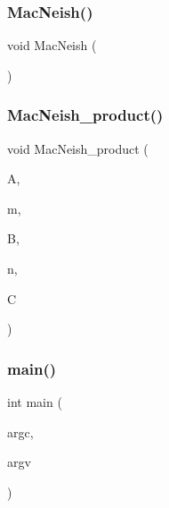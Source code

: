 \mbox{\label{test_8_c_aa6a4aba2ea40865428ca95da4a7f94fc}} 
\subsubsection{\texorpdfstring{Mac\+Neish()}{MacNeish()}}
{\footnotesize\ttfamily void Mac\+Neish (\begin{DoxyParamCaption}{ }\end{DoxyParamCaption})}

\mbox{\label{test_8_c_ae897b5b7c4cdc3f71d634b18fd1ccc96}} 
\subsubsection{\texorpdfstring{Mac\+Neish\+\_\+product()}{MacNeish\_product()}}
{\footnotesize\ttfamily void Mac\+Neish\+\_\+product (\begin{DoxyParamCaption}\item[{\mbox{\hyperlink{galois_8h_a09fddde158a3a20bd2dcadb609de11dc}{I\+NT}} $\ast$}]{A,  }\item[{\mbox{\hyperlink{galois_8h_a09fddde158a3a20bd2dcadb609de11dc}{I\+NT}}}]{m,  }\item[{\mbox{\hyperlink{galois_8h_a09fddde158a3a20bd2dcadb609de11dc}{I\+NT}} $\ast$}]{B,  }\item[{\mbox{\hyperlink{galois_8h_a09fddde158a3a20bd2dcadb609de11dc}{I\+NT}}}]{n,  }\item[{\mbox{\hyperlink{galois_8h_a09fddde158a3a20bd2dcadb609de11dc}{I\+NT}} $\ast$}]{C }\end{DoxyParamCaption})}

\mbox{\label{test_8_c_a3c04138a5bfe5d72780bb7e82a18e627}} 
\subsubsection{\texorpdfstring{main()}{main()}}
{\footnotesize\ttfamily int main (\begin{DoxyParamCaption}\item[{int}]{argc,  }\item[{char $\ast$$\ast$}]{argv }\end{DoxyParamCaption})}

